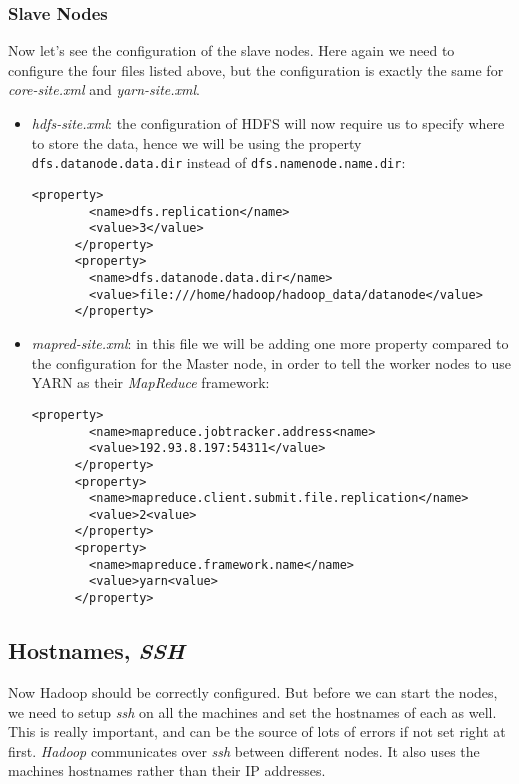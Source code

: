 \documentclass[a4paper, 12pt]{article}
\begin{document}
    \subsubsection{Slave Nodes}

Now let's see the configuration of the slave nodes. Here again we need to configure the four files listed above, but the configuration is exactly the same for \textit{core-site.xml} and \textit{yarn-site.xml}.
    
\begin{itemize}
  \item \textit{hdfs-site.xml}: the configuration of HDFS will now require us to specify where to store the data, hence we will be using the property \texttt{dfs.datanode.data.dir} instead of \texttt{dfs.namenode.name.dir}:
    \begin{lstlisting}[style=xml]
      <property>
        <name>dfs.replication</name>
        <value>3</value>
      </property>
      <property>
        <name>dfs.datanode.data.dir</name>
        <value>file:///home/hadoop/hadoop_data/datanode</value>
      </property>
    \end{lstlisting}
  \item \textit{mapred-site.xml}: in this file we will be adding one more property compared to the configuration for the Master node, in order to tell the worker nodes to use YARN as their \textit{MapReduce} framework:
    \begin{lstlisting}[style=xml]
      <property>
        <name>mapreduce.jobtracker.address<name>
        <value>192.93.8.197:54311</value>
      </property>
      <property>
        <name>mapreduce.client.submit.file.replication</name>
        <value>2<value>
      </property>
      <property>
        <name>mapreduce.framework.name</name>
        <value>yarn<value>
      </property>
    \end{lstlisting}
\end{itemize}
    
  \subsection{Hostnames, \textit{SSH}}

Now Hadoop should be correctly configured. But before we can start the nodes, we need to setup \textit{ssh} on all the machines and set the hostnames of each as well. This is really important, and can be the source of lots of errors if not set right at first. \textit{Hadoop} communicates over \textit{ssh} between different nodes. It also uses the machines hostnames rather than their IP addresses.
\end{document}
